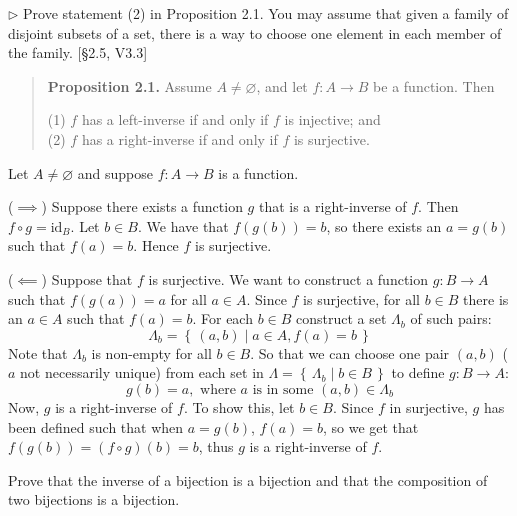 \documentclass[12pt,letterpaper,boxed]{hmcpset}
\newcommand{\id}{\mathrm{id}}
\newcommand{\set}[1]{\left\{\,#1\,\right\}}
\begin{document}
\begin{problem}[2.2]
	$\rhd$ Prove statement (2) in Proposition 2.1. You may assume that given a
	family of disjoint subsets of a set, there is a way to choose one element in
	each member of the family. [\S2.5, V3.3]
	
	
\end{problem}
\begin{quote} 
	\textbf{Proposition 2.1.} Assume $A\neq\varnothing$, and let $f:A\to
	B$ be a function. Then
	
	(1) $f$ has a left-inverse if and only if $f$ is injective; and \\
	(2) $f$ has a right-inverse if and only if $f$ is surjective.
\end{quote}
\begin{solution}
	
	Let $A\neq\varnothing$ and suppose $f:A\to B$ is a function.
	
	($\implies$) Suppose there exists a function $g$ that is a right-inverse of $f$.
	Then $f\circ g = \id_B$. Let $b\in B$. We have that $f(g(b)) = b$, so there
	exists an $a = g(b)$ such that $f(a) = b$. Hence $f$ is surjective.
	
	($\impliedby$) Suppose that $f$ is surjective. We want to construct a function
	$g:B\to A$ such that $f(g(a)) = a$ for all $a\in A$. Since $f$ is surjective,
	for all $b\in B$ there is an $a\in A$ such that $f(a) = b$. For each $b\in B$
	construct a set $\Lambda_b$ of such pairs:
	\[ \Lambda_b = \set{ (a,b) \mid a \in A, f(a) = b } \]
	Note that $\Lambda_b$ is non-empty for all $b\in B$. So that we can choose one
	pair $(a,b)$ ($a$ not necessarily unique) from each set in $\Lambda =
	\set{\Lambda_b\mid b\in B}$ to define $g:B\to A$:
	\[ g(b) = a, \text{ where $a$ is in some $(a,b)\in\Lambda_b$} \]
	Now, $g$ is a right-inverse of $f$. To show this, let $b\in B$. Since $f$ in
	surjective, $g$ has been defined such that when $a=g(b)$, $f(a)=b$, so we get
	that $f(g(b)) = (f\circ g)(b) = b$, thus $g$ is a right-inverse of $f$.
\end{solution}


\begin{problem}[2.3]
	Prove that the inverse of a bijection is a bijection and that the
	composition of two bijections is a bijection.
\end{problem}
\end{document}
